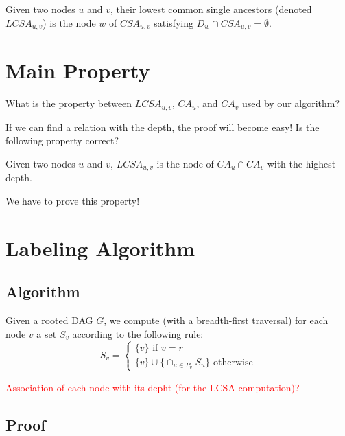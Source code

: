 \documentclass{paper}
\newtheorem{theorem}{Theorem}
\newenvironment{proof}{{\noindent\bf Proof. } }{{\hfill $\Box$}}
\begin{document}
Given two nodes $u$ and $v$, their lowest common single ancestors (denoted $LCSA_{u,v}$) is the node $w$ of $CSA_{u,v}$ satisfying $D_w\cap CSA_{u,v}=\emptyset$.

\section{Main Property}

{\color{red}
What is the property between $LCSA_{u,v}$, $CA_u$, and $CA_v$ used by our algorithm?

If we can find a relation with the depth, the proof will become easy! Is the following property correct?

Given two nodes $u$ and $v$, $LCSA_{u,v}$ is the node of $CA_u\cap CA_v$ with the highest depth.

We have to prove this property!
}



\section{Labeling Algorithm}

\subsection{Algorithm}

Given a rooted DAG $G$, we compute (with a breadth-first traversal) for each node $v$ a set $S_v$ according to the following rule:
\[
S_v=\begin{cases}
\{v\} \text{ if } v=r\\
\{v\}\cup\{\cap_{u\in P_v} S_u\} \text{ otherwise}
\end{cases}
\]

\textcolor{red}{Association of each node with its depht (for the LCSA computation)?}

 
\subsection{Proof}
\end{document}
